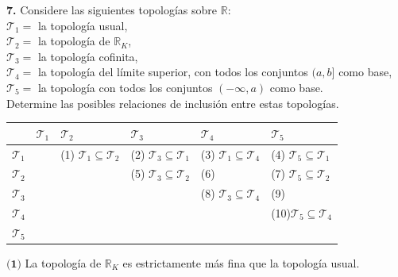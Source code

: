 \documentclass{article}
\newcommand{\xmark}{\ding{55}}
\begin{document}
\begin{mybox}
	\textbf{7. } Considere las siguientes topologías sobre $\mathbb{R}:$ \\
	
	$ \mathcal{T}_{1} = $ la topología usual, \\
	$\mathcal{T}_{2} = $ la topología de $\mathbb{R}_{K}$, \\
	$\mathcal{T}_{3} = $ la topología cofinita, \\
	$\mathcal{T}_{4} = $ la topología del límite superior, con todos los conjuntos $(a, b ]$ como base, \\
	$\mathcal{T}_{5} = $ la topología con todos los conjuntos $(- \infty, a)$ como base.  \\
	
	Determine las posibles relaciones de inclusión entre estas topologías. 
\end{mybox}	
 \begin{table}[h]
 	\begin{tabularx}{\textwidth}{|X|X|X|X|X|X|}
 		\hline
 		&$\mathcal{T}_{1}$   &$\mathcal{T}_{2}$ & $\mathcal{T}_{3}$ & $\mathcal{T}_{4}$ & $\mathcal{T}_{5}$ \\ \hline
 		
 		$\mathcal{T}_{1}$ &  \cellcolor{blue!25} &(1) $\mathcal{T}_{1} \subseteq \mathcal{T}_{2}$ &(2) $\mathcal{T}_{3} \subseteq \mathcal{T}_{1}$  &(3) $\mathcal{T}_{1} \subseteq \mathcal{T}_{4}$ &(4) $\mathcal{T}_{5} \subseteq \mathcal{T}_{1}$ \\ \hline
 		
 		$\mathcal{T}_{2}$ &  &  \cellcolor{blue!25} &(5) $\mathcal{T}_{3} \subseteq \mathcal{T}_{2}$  &(6) \hspace{0.2cm} \textcolor{red}{\xmark} &(7) $\mathcal{T}_{5} \subseteq \mathcal{T}_{2}$ \\ \hline
 		
 		$\mathcal{T}_{3}$ &  &  & \cellcolor{blue!25} &(8) $\mathcal{T}_{3} \subseteq \mathcal{T}_{4}$ &(9) \hspace{0.2cm} \textcolor{red}{\xmark} \\ \hline
 		
 		$\mathcal{T}_{4}$ &  &  &  & \cellcolor{blue!25} &(10)$\mathcal{T}_{5} \subseteq \mathcal{T}_{4}$ \\ \hline
 		
 		$\mathcal{T}_{5}$ &  &  &  &  & \cellcolor{blue!25} \\ \hline
 		
 		\end{tabularx}
 \end{table}
\newpage
$\textbf{(1)}$ La topología de $\mathbb{R}_{K}$ es estrictamente más fina que la topología usual. \\
\end{document}
